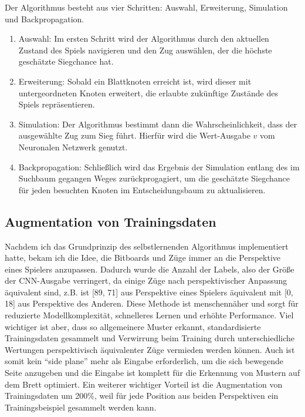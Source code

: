 \documentclass{jpp}
\begin{document}
Der Algorithmus besteht aus vier Schritten: Auswahl, Erweiterung, Simulation und Backpropagation.
\begin{enumerate}

\item Auswahl: Im ersten Schritt wird der Algorithmus durch den aktuellen Zustand des Spiels navigieren und den Zug auswählen, der die höchste geschätzte Siegchance hat.

\item Erweiterung: Sobald ein Blattknoten erreicht ist, wird dieser mit untergeordneten Knoten erweitert, die erlaubte zukünftige Zustände des Spiels repräsentieren.

\item Simulation: Der Algorithmus bestimmt dann die Wahrscheinlichkeit, dass der ausgewählte Zug zum Sieg führt. Hierfür wird die Wert-Ausgabe $v$ vom Neuronalen Netzwerk genutzt.

\item Backpropagation: Schließlich wird das Ergebnis der Simulation entlang des im Suchbaum gegangen Weges zurückprogagiert, um die geschätzte Siegchance für jeden besuchten Knoten im Entscheidungsbaum zu aktualisieren.
\end{enumerate}

\subsection{Augmentation von Trainingsdaten}
Nachdem ich das Grundprinzip des selbstlernenden Algorithmus  implementiert hatte, bekam ich die Idee, die Bitboards und Züge immer an die Perspektive eines  Spielers anzupassen.
Dadurch wurde die Anzahl der Labels, also der Größe der CNN-Ausgabe verringert, da einige Züge nach perspektivischer Anpassung äquivalent sind, z.B. ist [89, 71] aus Perspektive eines Spielers äquivalent mit [0, 18] aus Perspektive des Anderen. Diese Methode ist menschennäher und sorgt für reduzierte Modellkomplexität, schnelleres Lernen und erhöhte Performance. Viel wichtiger ist aber, dass so allgemeinere Muster erkannt, standardisierte Trainingsdaten gesammelt und Verwirrung beim Training durch unterschiedliche Wertungen perspektivisch äquivalenter Züge vermieden werden können. Auch ist somit kein “side plane” mehr als Eingabe erforderlich, um die sich bewegende Seite anzugeben und die Eingabe ist komplett für die Erkennung von Mustern auf dem Brett optimiert. Ein weiterer wichtiger Vorteil ist die Augmentation von Trainingsdaten um 200\%, weil für jede Position aus beiden Perspektiven ein Trainingsbeispiel gesammelt werden kann.
\end{document}
